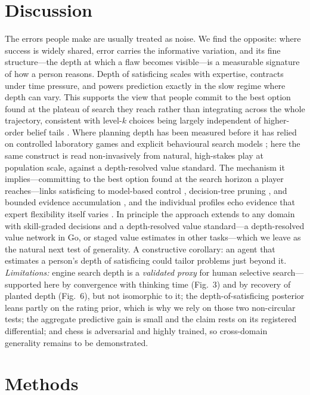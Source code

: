 \documentclass[11pt]{article}
\begin{document}
\section{Discussion}
The errors people make are usually treated as noise. We find the opposite: where success is
widely shared, error carries the informative variation, and its fine structure---the depth at
which a flaw becomes visible---is a measurable signature of how a person reasons. Depth of
satisficing scales with expertise, contracts under time pressure, and powers prediction
exactly in the slow regime where depth can vary. This supports the view that people commit to
the best option found at the plateau of search they reach rather than integrating across the
whole trajectory, consistent with level-$k$ choices being largely independent of higher-order
belief tails \citep{strzalecki2014}. Where planning depth has been measured before it has
relied on controlled laboratory games and explicit behavioural search models
\citep{callaway2022,vanopheusden2023}; here the same construct is read non-invasively from
natural, high-stakes play at population scale, against a depth-resolved value standard. The
mechanism it implies---committing to the best option found at the search horizon a player
reaches---links satisficing to model-based control \citep{daw2005}, decision-tree pruning
\citep{huys2012}, and bounded evidence accumulation \citep{ratcliff2008}, and the individual
profiles echo evidence that expert flexibility itself varies \citep{bilalic2008}. In principle
the approach extends to any domain with
skill-graded decisions and a depth-resolved value standard---a depth-resolved value network in
Go, or staged value estimates in other tasks---which we leave as the natural next test of
generality. A constructive corollary: an agent that estimates a person's depth of satisficing
could tailor problems just beyond it. \emph{Limitations:} engine search depth is a
\emph{validated proxy} for human selective search---supported here by convergence with
thinking time (Fig.~3) and by recovery of planted depth (Fig.~6), but not isomorphic to it;
the depth-of-satisficing posterior leans partly on the rating prior, which is why we rely on
those two non-circular tests; the aggregate predictive gain is small and the claim rests on
its registered differential; and chess is adversarial and highly trained, so cross-domain
generality remains to be demonstrated.

\section{Methods}
\end{document}
